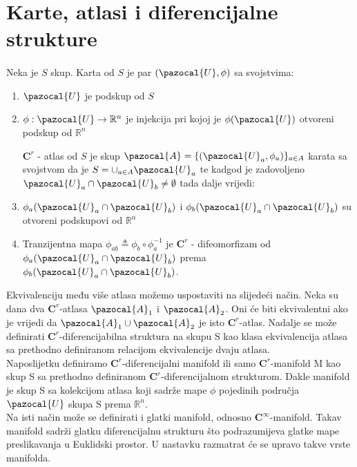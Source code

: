 \documentclass[times, utf8, diplomski]{fer}
\newcommand{\Ua}{\pazocal{U}}
\newcommand{\Aa}{\pazocal{A}}
\begin{document}
\section{Karte, atlasi i diferencijalne strukture}
	\paragraph{} Neka je $S$ skup. Karta od $S$ je par $(\Ua, \phi)$ sa svojstvima:
	\begin{enumerate}
		\item $\Ua$ je podskup od $S$
		\item $\phi: \Ua \rightarrow \mathbb{R}^n$ je injekcija pri kojoj je $\phi(\Ua)$ otvoreni podskup od $\mathbb{R}^n$
		
		$\boldsymbol{C}^r$ - atlas od $S$ je skup $\Aa = \{ (\Ua_a, \phi_a) \}_{a\in A}$ karata sa svojstvom da je $S = \cup_{a\in A}\Ua_a$ te kadgod je zadovoljeno $\Ua_a \cap \Ua_b \neq \emptyset$ tada dalje vrijedi:
		
		\item $\phi_a(\Ua_a \cap \Ua_b)$ i $\phi_b(\Ua_a\cap \Ua_b)$ su otvoreni podskupovi od $\mathbb{R}^n$
		\item Tranzijentna mapa $\phi_{ab} \triangleq \phi_b \circ \phi_a^{-1}$ je $\boldsymbol{C}^r$ - difeomorfizam od $\phi_a(\Ua_a \cap \Ua_b)$ prema $\phi_b(\Ua_a\cap \Ua_b)$.
	\end{enumerate}
	
	Ekvivalenciju među više atlasa možemo uspostaviti na slijedeći način. Neka su dana dva $\boldsymbol{C}^r$-atlasa $\Aa_1$ i $\Aa_2$. Oni će biti ekvivalentni ako je vrijedi da $\Aa_1 \cup \Aa_2$ je isto $\boldsymbol{C}^r$-atlas. Nadalje se može definirati $\boldsymbol{C}^r$-diferencijabilna struktura na skupu S kao klasa ekvivalencija atlasa sa prethodno definiranom relacijom ekvivalencije dvaju atlasa. \\
	Naposlijetku definiramo $\boldsymbol{C}^r$-diferencijalni manifold ili samo $\boldsymbol{C}^r$-manifold M kao skup S sa prethodno definiranom $\boldsymbol{C}^r$-diferencijalnom strukturom. Dakle manifold je skup S sa kolekcijom atlasa koji sadrže mape $\phi$ pojedinih područja $\Ua$ skupa S prema $\mathbb{R}^n$. \\
	Na isti način može se definirati i glatki manifold, odnosno $\boldsymbol{C}^\infty$-manifold. Takav manifold sadrži glatku diferencijalnu strukturu što podrazumijeva glatke mape preslikavanja u Euklidski prostor. U nastavku razmatrat će se upravo takve vrste manifolda.
	
\end{document}
